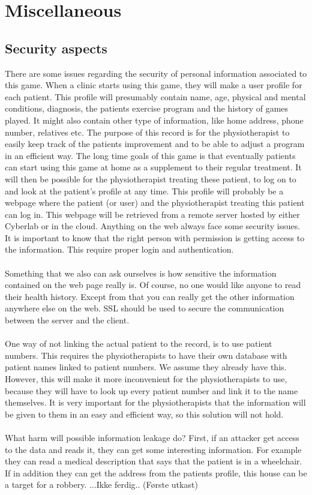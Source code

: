 \chapter{Miscellaneous}
\section{Security aspects}
There are some issues regarding the security of personal information associated to this game. When a clinic starts using this game, they will make a user profile for each patient. This profile will presumably contain name, age, physical and mental conditions, diagnosis, the patients exercise program and the history of games played. It might also contain other type of information, like home address, phone number, relatives etc. The purpose of this record is for the physiotherapist to easily keep track of the patients improvement and to be able to adjust a program in an efficient way. The long time goals of this game is that eventually patients can start using this game at home as a supplement to their regular treatment. It will then be possible for the physiotherapist treating these patient, to log on to and look at the patient’s profile at any time. This profile will probably be a webpage where the patient (or user) and the physiotherapist treating this patient can log in. This webpage will be retrieved from a remote server hosted by either Cyberlab or in the cloud. Anything on the web always face some security issues. It is important to know that the right person with permission is getting access to the information. This require proper login and authentication.\\ \\
Something that we also can ask ourselves is how sensitive the information contained on the web page really is. Of course, no one would like anyone to read their health history. Except from that you can really get the other information anywhere else on the web. SSL should be used to secure the communication between the server and the client. \\ \\
One way of not linking the actual patient to the record, is to use patient numbers. This requires the physiotherapists to have their own database with patient names linked to patient numbers. We assume they already have this. However, this will make it more inconvenient for the physiotherapists to use, because they will have to look up every patient number and link it to the name themselves. It is very important for the physiotherapists that the information will be given to them in an easy and efficient way, so this solution will not hold. \\ \\
What harm will possible information leakage do? First, if an attacker get access to the data and reads it, they can get some interesting information. For example they can read a medical description that says that the patient is in a wheelchair. If in addition they can get the address from the patients profile, this house can be a target for a robbery. ...Ikke ferdig.. (Første utkast)